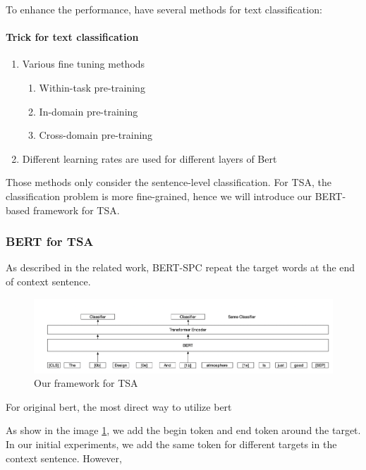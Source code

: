 \documentclass[fyp]{socreport}
\begin{document}
To enhance the performance, \cite{sun2019finetune} have several methods for text classification: 


\paragraph{Trick for text classification}

\begin{enumerate}
    \item Various fine tuning methods
    \begin{enumerate}
        \item Within-task pre-training
        \item In-domain pre-training
        \item Cross-domain pre-training
    \end{enumerate}
    
    \item Different learning rates are used for different layers of Bert
\end{enumerate}


Those methods only consider the sentence-level classification. For TSA, the classification problem is more fine-grained, hence we will introduce our BERT-based framework for TSA.


\subsubsection{BERT for TSA}

As described in the related work, BERT-SPC \cite{Song2019} repeat the target words at the end of context sentence. 

\begin{figure}[h]
    \centering
    \includegraphics[width=\linewidth]{./image/Framework.png}
    \caption{Our framework for TSA}
  \label{Framework}
\end{figure}

For original bert, the most direct way to utilize bert

As show in the image \ref{Framework}, we add the begin token and end token around the target. In our initial experiments, we add the same token for different targets in the context sentence. However, 
\end{document}
